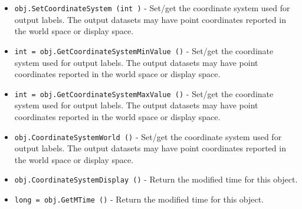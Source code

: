 \begin{itemize}
\item  \verb|obj.SetCoordinateSystem (int )| -  Set/get the coordinate system used for output labels.
 The output datasets may have point coordinates reported in the world space or display space.

\item  \verb|int = obj.GetCoordinateSystemMinValue ()| -  Set/get the coordinate system used for output labels.
 The output datasets may have point coordinates reported in the world space or display space.

\item  \verb|int = obj.GetCoordinateSystemMaxValue ()| -  Set/get the coordinate system used for output labels.
 The output datasets may have point coordinates reported in the world space or display space.

\item  \verb|obj.CoordinateSystemWorld ()| -  Set/get the coordinate system used for output labels.
 The output datasets may have point coordinates reported in the world space or display space.

\item  \verb|obj.CoordinateSystemDisplay ()| -  Return the modified time for this object.

\item  \verb|long = obj.GetMTime ()| -  Return the modified time for this object.

\end{itemize}
